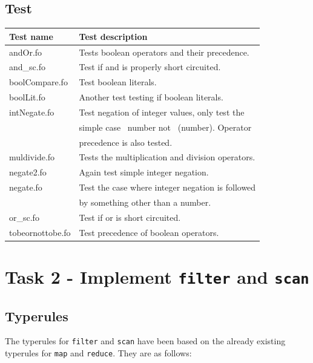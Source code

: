 \documentclass[11pt]{article}
\begin{document}
    \subsection{Test}
    \begin{tabular}{|l|l|}
        \hline
        \textbf{Test name} & \textbf{Test description}                        \\
        \hline
        andOr.fo           & Tests boolean operators and their precedence.    \\
        \hline
        and\_sc.fo         & Test if and is properly short circuited.         \\
        \hline
        boolCompare.fo     & Test boolean literals.                           \\
        \hline
        boolLit.fo         & Another test testing if boolean literals.        \\
        \hline
        intNegate.fo       & Test negation of integer values, only test the   \\
                           & simple case ~number not ~(number).  Operator     \\
                           & precedence is also tested.                       \\
        \hline
        muldivide.fo       & Tests the multiplication and division operators. \\
        \hline
        negate2.fo         & Again test simple integer negation.              \\
        \hline
        negate.fo          & Test the case where integer negation is followed \\
                           & by something other than a number.                \\
        \hline
        or\_sc.fo          & Test if or is short circuited.                   \\
        \hline
        tobeornottobe.fo   & Test precedence of boolean operators.            \\
        \hline
    \end{tabular}

    \section{Task 2 - Implement \texttt{filter} and \texttt{scan}}
    \subsection{Typerules}
    The typerules for \texttt{filter} and \texttt{scan} have been based on the
    already existing typerules for \texttt{map} and \texttt{reduce}. They are as
    follows: \\
\end{document}
